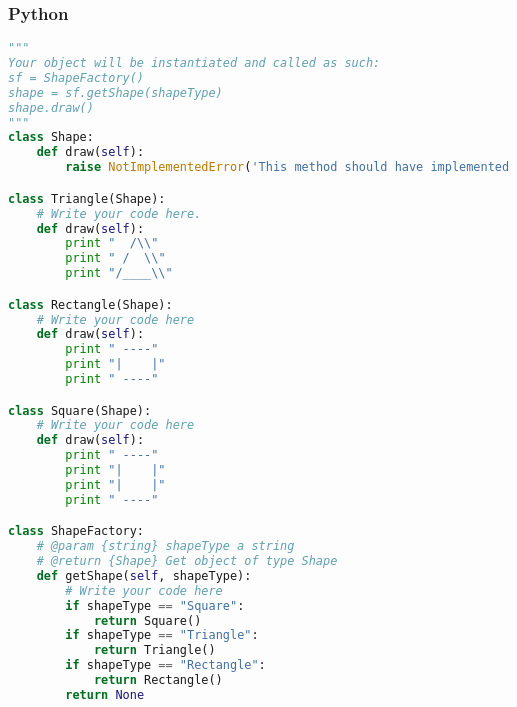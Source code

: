 \subsubsection{Python}
\begin{lstlisting}[language=Python]
"""
Your object will be instantiated and called as such:
sf = ShapeFactory()
shape = sf.getShape(shapeType)
shape.draw()
"""
class Shape:
    def draw(self):
        raise NotImplementedError('This method should have implemented.')

class Triangle(Shape):
    # Write your code here.
    def draw(self):
        print "  /\\"
        print " /  \\"
        print "/____\\"

class Rectangle(Shape):
    # Write your code here
    def draw(self):
        print " ----"
        print "|    |"
        print " ----"

class Square(Shape):
    # Write your code here
    def draw(self):
        print " ----"
        print "|    |"
        print "|    |"
        print " ----"

class ShapeFactory:
    # @param {string} shapeType a string
    # @return {Shape} Get object of type Shape
    def getShape(self, shapeType):
        # Write your code here
        if shapeType == "Square":
            return Square()
        if shapeType == "Triangle":
            return Triangle()
        if shapeType == "Rectangle":
            return Rectangle()
        return None
        
\end{lstlisting}
\normalsize 